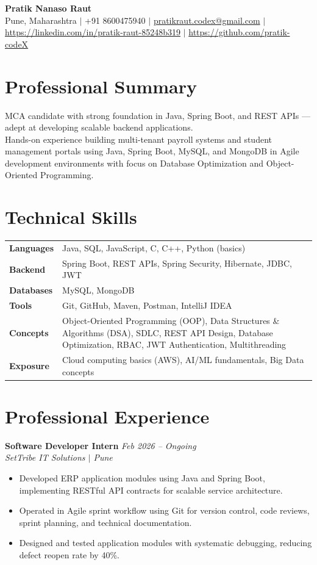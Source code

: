 \documentclass[10.5pt,a4paper]{article}
\begin{document}
\begin{center}
{\Large\bfseries Pratik Nanaso Raut}\\[2pt]
Pune, Maharashtra $|$ +91 8600475940 $|$ \href{mailto:pratikraut.codex@gmail.com}{pratikraut.codex@gmail.com} $|$ \href{https://linkedin.com/in/pratik-raut-85248b319}{https://linkedin.com/in/pratik-raut-85248b319} $|$ \href{https://github.com/pratik-codeX}{https://github.com/pratik-codeX}
\end{center}
\vspace{-2pt}
\section{Professional Summary}
MCA candidate with strong foundation in Java, Spring Boot, and REST APIs — adept at developing scalable backend applications.\\[2pt]
Hands-on experience building multi-tenant payroll systems and student management portals using Java, Spring Boot, MySQL, and MongoDB in Agile development environments with focus on Database Optimization and Object-Oriented Programming.
\section{Technical Skills}
\begin{tabular}{@{}p{}p{}@{}}
\textbf{Languages} & Java, SQL, JavaScript, C, C++, Python (basics) \\[1pt]
\textbf{Backend} & Spring Boot, REST APIs, Spring Security, Hibernate, JDBC, JWT \\[1pt]
\textbf{Databases} & MySQL, MongoDB \\[1pt]
\textbf{Tools} & Git, GitHub, Maven, Postman, IntelliJ IDEA \\[1pt]
\textbf{Concepts} & Object-Oriented Programming (OOP), Data Structures \& Algorithms (DSA), SDLC, REST API Design, Database Optimization, RBAC, JWT Authentication, Multithreading \\[1pt]
\textbf{Exposure} & Cloud computing basics (AWS), AI/ML fundamentals, Big Data concepts \\
\end{tabular}
\section{Professional Experience}
\textbf{Software Developer Intern} \hfill \textit{Feb 2026 -- Ongoing}
\\\textit{SetTribe IT Solutions $|$ Pune}
\begin{itemize}
  \item Developed ERP application modules using Java and Spring Boot, implementing RESTful API contracts for scalable service architecture.
  \item Operated in Agile sprint workflow using Git for version control, code reviews, sprint planning, and technical documentation.
  \item Designed and tested application modules with systematic debugging, reducing defect reopen rate by 40\%.
\end{itemize}
\end{document}
